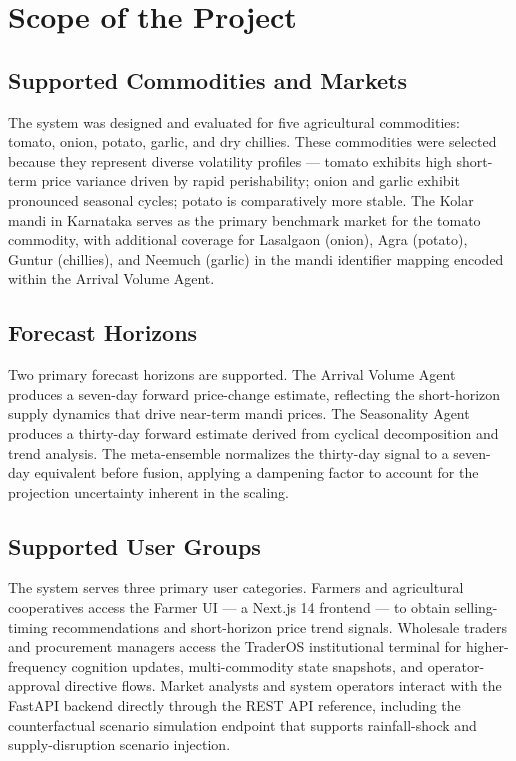 \documentclass[12pt,a4paper]{report}
\begin{document}
\section{Scope of the Project}

\subsection{Supported Commodities and Markets}

The system was designed and evaluated for five agricultural commodities: tomato, onion, potato, garlic, and dry chillies. These commodities were selected because they represent diverse volatility profiles — tomato exhibits high short-term price variance driven by rapid perishability; onion and garlic exhibit pronounced seasonal cycles; potato is comparatively more stable. The Kolar mandi in Karnataka serves as the primary benchmark market for the tomato commodity, with additional coverage for Lasalgaon (onion), Agra (potato), Guntur (chillies), and Neemuch (garlic) in the mandi identifier mapping encoded within the Arrival Volume Agent.

\subsection{Forecast Horizons}

Two primary forecast horizons are supported. The Arrival Volume Agent produces a seven-day forward price-change estimate, reflecting the short-horizon supply dynamics that drive near-term mandi prices. The Seasonality Agent produces a thirty-day forward estimate derived from cyclical decomposition and trend analysis. The meta-ensemble normalizes the thirty-day signal to a seven-day equivalent before fusion, applying a dampening factor to account for the projection uncertainty inherent in the scaling.

\subsection{Supported User Groups}

The system serves three primary user categories. Farmers and agricultural cooperatives access the Farmer UI — a Next.js 14 frontend — to obtain selling-timing recommendations and short-horizon price trend signals. Wholesale traders and procurement managers access the TraderOS institutional terminal for higher-frequency cognition updates, multi-commodity state snapshots, and operator-approval directive flows. Market analysts and system operators interact with the FastAPI backend directly through the REST API reference, including the counterfactual scenario simulation endpoint that supports rainfall-shock and supply-disruption scenario injection.
\end{document}
